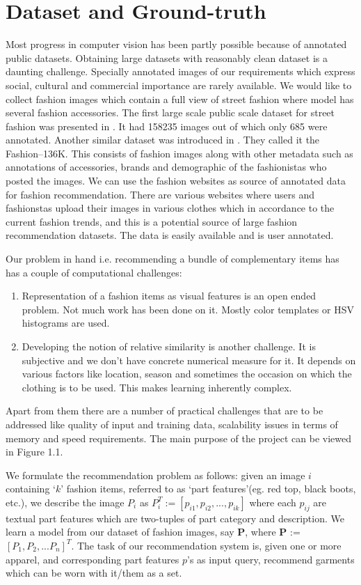 \section{Dataset and Ground-truth}
Most progress in computer vision has been partly possible because of annotated public datasets. Obtaining large datasets with reasonably clean dataset is a daunting challenge. Specially annotated images of our requirements which express social, cultural and commercial importance are rarely available. We would like to collect fashion images which contain a full view of street fashion where model has several fashion accessories. The first large scale public scale dataset for street fashion was presented in \cite{clothParsing}. It had 158235 images out of which only 685 were annotated. Another similar dataset was introduced in \cite{largeScaleReco}. They called it the Fashion--136K. This consists of fashion images along with other metadata such as annotations of accessories, brands and demographic of the fashionistas who posted the images. We can use the fashion websites as source of annotated data for fashion recommendation. There are various websites where users and fashionstas upload their images in various clothes which in accordance to the current fashion trends, and this is a potential source of large fashion recommendation datasets. The data is easily available and is user annotated.

Our problem in hand i.e. recommending a bundle of complementary items has has a couple of computational challenges:

\begin{enumerate}
\item Representation of a fashion items as visual features is an open ended problem. Not much work has been done on it. Mostly color templates or HSV histograms are used.
\item Developing the notion of relative similarity is another challenge. It is subjective and we don't have concrete numerical measure for it. It depends on various factors like location, season and sometimes the occasion on which the clothing is to be used. This makes learning inherently complex.
\end{enumerate}

Apart from them there are a number of practical challenges that are to be addressed like quality of input and training data, scalability issues in terms of memory and speed requirements. The main purpose of the project can be viewed in Figure 1.1.

We formulate the recommendation problem as follows: given an image $i$ containing `$k$' fashion items, referred to as `part features'(eg. red top, black boots, etc.), we describe the image $P_i$ as $P_i^{T} := [p_{i1}, p_{i2}, ..., p_{ik}]$ where each $p_{ij}$ are textual part features which are two-tuples of part category and description. We learn a model from our dataset of fashion images, say \textbf{P}, where \textbf{P} := $[P_1, P_2, ... P_n]^{T}$. The task of our recommendation system is, given one or more apparel, and corresponding part features $p$'s as input query, recommend garments which can be worn with it/them as a set.

